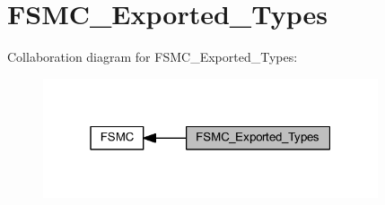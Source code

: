 \hypertarget{group___f_s_m_c___exported___types}{}\section{F\+S\+M\+C\+\_\+\+Exported\+\_\+\+Types}
\label{group___f_s_m_c___exported___types}
Collaboration diagram for F\+S\+M\+C\+\_\+\+Exported\+\_\+\+Types\+:
\nopagebreak
\begin{figure}[H]
\begin{center}
\leavevmode
\includegraphics[width=280pt]{group___f_s_m_c___exported___types}
\end{center}
\end{figure}
